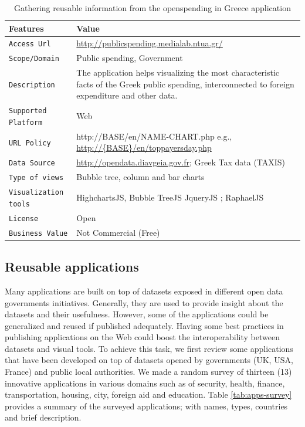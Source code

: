 \begin{table}[ht!b]
    \caption{Gathering reusable information from the openspending in Greece application} \label{tab:describeApps}
    \small
    \center
    \begin{tabularx}{\textwidth}{@{}lX@{}}
    \toprule
    \textbf{Features} & \textbf{Value}\\
    \toprule
    \texttt{Access Url }&	\url{http://publicspending.medialab.ntua.gr/}\\
    \midrule
    \texttt{Scope/Domain} &	Public spending, Government \\
    \midrule
    \texttt{Description} & The application helps visualizing the most characteristic facts of the Greek public spending, interconnected to foreign expenditure and other data. \\
    \midrule
    \texttt{Supported Platform} &	Web \\
    \midrule
    \texttt{URL Policy}   &  http://{BASE}/en/{NAME-CHART}.php e.g., \url{http://{BASE}/en/toppayersday.php} \\
    \midrule
    \texttt{Data Source}	& \url{http://opendata.diavgeia.gov.fr}; Greek Tax data (TAXIS) \\
    \midrule
\texttt{Type of views} & Bubble tree, column and bar charts \\
    \midrule
   \texttt{Visualization tools} &  HighchartsJS,  Bubble TreeJS JqueryJS ; RaphaelJS \\
   \midrule
  \texttt{License} & Open \\
    \midrule
\texttt{Business Value} & Not Commercial (Free) \\
    \bottomrule

    \end{tabularx}
    \end{table}

\subsection{Reusable applications} \label{sec:reusable}
Many applications are built on top of datasets exposed in different open data governments initiatives. Generally, they are used to provide insight about the datasets and their usefulness. However, some of the applications could be generalized and reused if published adequately. Having some best practices in publishing applications on the Web could boost the interoperability between datasets and visual tools. To achieve this task, we first review some applications that have been developed on top of datasets  opened by governments (UK, USA, France) and public local authorities. We made a random survey of thirteen (13) innovative applications \cite{deliverable2012a} in various domains such as of security, health, finance, transportation, housing, city, foreign aid and education. Table \ref{tab:apps-survey} provides a summary of the surveyed applications; with names, types, countries and brief description.

